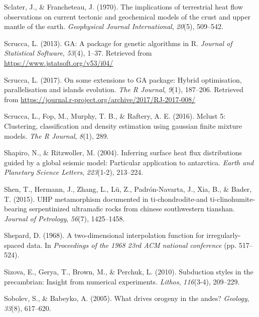 \begin{CSLReferences}{1}{1}
\leavevmode{}%
Sclater, J., \& Francheteau, J. (1970). The implications of terrestrial heat flow observations on current tectonic and geochemical models of the crust and upper mantle of the earth. \emph{Geophysical Journal International}, \emph{20}(5), 509--542.

\leavevmode{}%
Scrucca, L. (2013). {GA}: A package for genetic algorithms in {R}. \emph{Journal of Statistical Software}, \emph{53}(4), 1--37. Retrieved from \url{https://www.jstatsoft.org/v53/i04/}

\leavevmode{}%
Scrucca, L. (2017). On some extensions to {GA} package: Hybrid optimisation, parallelisation and islands evolution. \emph{The R Journal}, \emph{9}(1), 187--206. Retrieved from \url{https://journal.r-project.org/archive/2017/RJ-2017-008/}

\leavevmode{}%
Scrucca, L., Fop, M., Murphy, T. B., \& Raftery, A. E. (2016). Mclust 5: Clustering, classification and density estimation using gaussian finite mixture models. \emph{The R Journal}, \emph{8}(1), 289.

\leavevmode{}%
Shapiro, N., \& Ritzwoller, M. (2004). Inferring surface heat flux distributions guided by a global seismic model: Particular application to antarctica. \emph{Earth and Planetary Science Letters}, \emph{223}(1-2), 213--224.

\leavevmode{}%
Shen, T., Hermann, J., Zhang, L., Lü, Z., Padrón-Navarta, J., Xia, B., \& Bader, T. (2015). UHP metamorphism documented in ti-chondrodite-and ti-clinohumite-bearing serpentinized ultramafic rocks from chinese southwestern tianshan. \emph{Journal of Petrology}, \emph{56}(7), 1425--1458.

\leavevmode{}%
Shepard, D. (1968). A two-dimensional interpolation function for irregularly-spaced data. In \emph{Proceedings of the 1968 23rd ACM national conference} (pp. 517--524).

\leavevmode{}%
Sizova, E., Gerya, T., Brown, M., \& Perchuk, L. (2010). Subduction styles in the precambrian: Insight from numerical experiments. \emph{Lithos}, \emph{116}(3-4), 209--229.

\leavevmode{}%
Sobolev, S., \& Babeyko, A. (2005). What drives orogeny in the andes? \emph{Geology}, \emph{33}(8), 617--620.


\end{CSLReferences}
